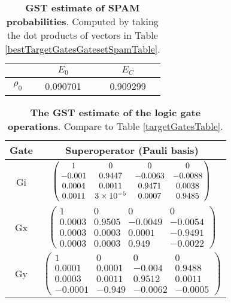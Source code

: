 {\begin{table}[h]
\begin{center}
\begin{tabular}[l]{|c|c|c|}
\hline
 & $E_{0}$ & $E_C$ \\ \hline
$\rho_{0}$ & 0.090701 & 0.909299 \\ \hline
\end{tabular}

\caption{\textbf{GST estimate of SPAM probabilities}.  Computed by taking the dot products of vectors in Table \ref{bestTargetGatesGatesetSpamTable}.\label{bestTargetGatesGatesetSpamParametersTable}}
\end{center}
\end{table}

\begin{table}[h]
\begin{center}
\begin{tabular}[l]{|c|c|}
\hline
Gate & Superoperator (Pauli basis) \\ \hline
Gi & $ \left(\!\!\begin{array}{cccc}
1 & 0 & 0 & 0 \\ 
-0.001 & 0.9447 & -0.0063 & -0.0088 \\ 
0.0004 & 0.0011 & 0.9471 & 0.0038 \\ 
0.0011 & 3\times 10^{-5} & 0.0007 & 0.9485
 \end{array}\!\!\right) $
 \\ \hline
Gx & $ \left(\!\!\begin{array}{cccc}
1 & 0 & 0 & 0 \\ 
0.0003 & 0.9505 & -0.0049 & -0.0054 \\ 
0.0003 & 0.0003 & 0.0001 & -0.9491 \\ 
0.0003 & 0.0003 & 0.949 & -0.0022
 \end{array}\!\!\right) $
 \\ \hline
Gy & $ \left(\!\!\begin{array}{cccc}
1 & 0 & 0 & 0 \\ 
0.0001 & 0.0001 & -0.004 & 0.9488 \\ 
0.0003 & 0.0011 & 0.9512 & 0.0011 \\ 
-0.0001 & -0.949 & -0.0062 & -0.0005
 \end{array}\!\!\right) $
 \\ \hline
\end{tabular}

\caption{\textbf{The GST estimate of the logic gate operations}.  Compare to Table \ref{targetGatesTable}.\label{bestTargetGatesGatesetGatesTable}}
\end{center}
\end{table}

}
